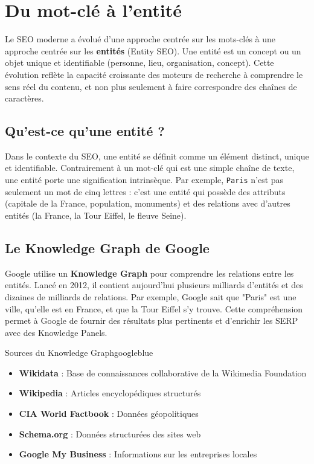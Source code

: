 \documentclass[12pt,a4paper,twoside]{report}
\newcommand{\keyword}[1]{\textbf{\textcolor{googleblue}{#1}}}
\begin{document}
\section{Du mot-clé à l'entité}

Le SEO moderne a évolué d'une approche centrée sur les mots-clés à une approche centrée sur les \keyword{entités} (Entity SEO). Une entité est un concept ou un objet unique et identifiable (personne, lieu, organisation, concept). Cette évolution reflète la capacité croissante des moteurs de recherche à comprendre le sens réel du contenu, et non plus seulement à faire correspondre des chaînes de caractères.

\subsection{Qu'est-ce qu'une entité ?}

Dans le contexte du SEO, une entité se définit comme un élément distinct, unique et identifiable. Contrairement à un mot-clé qui est une simple chaîne de texte, une entité porte une signification intrinsèque. Par exemple, \texttt{Paris} n'est pas seulement un mot de cinq lettres : c'est une entité qui possède des attributs (capitale de la France, population, monuments) et des relations avec d'autres entités (la France, la Tour Eiffel, le fleuve Seine).

\subsection{Le Knowledge Graph de Google}

Google utilise un \keyword{Knowledge Graph} pour comprendre les relations entre les entités. Lancé en 2012, il contient aujourd'hui plusieurs milliards d'entités et des dizaines de milliards de relations. Par exemple, Google sait que "Paris" est une ville, qu'elle est en France, et que la Tour Eiffel s'y trouve. Cette compréhension permet à Google de fournir des résultats plus pertinents et d'enrichir les SERP avec des Knowledge Panels.

\begin{mybox}{Sources du Knowledge Graph}{googleblue}
\begin{itemize}
    \item \textbf{Wikidata} : Base de connaissances collaborative de la Wikimedia Foundation
    \item \textbf{Wikipedia} : Articles encyclopédiques structurés
    \item \textbf{CIA World Factbook} : Données géopolitiques
    \item \textbf{Schema.org} : Données structurées des sites web
    \item \textbf{Google My Business} : Informations sur les entreprises locales
\end{itemize}
\end{mybox}
\end{document}
